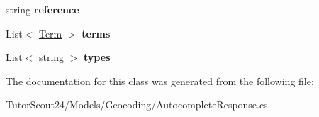 \begin{DoxyCompactItemize}
string {\bfseries reference}
\item 
\mbox{\label{class_tutor_scout24_1_1_models_1_1_geocoding_1_1_prediction_a1092cdaf243ff830fc38b7e08abb6be8}} 
List$<$ \mbox{\hyperlink{class_tutor_scout24_1_1_models_1_1_geocoding_1_1_term}{Term}} $>$ {\bfseries terms}
\item 
\mbox{\label{class_tutor_scout24_1_1_models_1_1_geocoding_1_1_prediction_a0756b03f308d2938f7b0cd6b03988651}} 
List$<$ string $>$ {\bfseries types}
\end{DoxyCompactItemize}


The documentation for this class was generated from the following file\+:\begin{DoxyCompactItemize}
\item 
Tutor\+Scout24/\+Models/\+Geocoding/Autocomplete\+Response.\+cs\end{DoxyCompactItemize}
